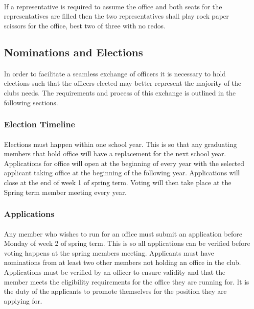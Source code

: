 \documentclass[12pt]{article}
\begin{document}
\paragraph{}
If a representative is required to assume the office and both seats for the representatives are 
filled then the two representatives shall play rock paper scissors for the office, best two of three
with no redos.

 
\subsection{Nominations and Elections}
\paragraph{}
In order to facilitate a seamless exchange of officers it is necessary to hold elections such that the officers elected may better represent the majority of the clubs needs. The requirements and process of this exchange is outlined in the following sections.

\subsubsection{Election Timeline}
\paragraph{}
Elections must happen within one school year. This is so that any graduating members that hold office will have a replacement for the next school year. Applications for office will open at the 
beginning of every year with the selected applicant taking office at the beginning of the following 
year. Applications will close at the end of week 1 of spring term. Voting will then take place at the Spring term member meeting every year.

\subsubsection{Applications}
\paragraph{}
Any member who wishes to run for an office must submit an application before Monday of week 2 of spring term. 
This is so all applications can be verified before voting happens at the spring members meeting.
Applicants must have nominations from at least two other members not holding an office in the club. 
Applications must be verified by an officer to ensure validity and that the member meets the eligibility requirements for the office they are running for.
It is the duty of the applicants to promote themselves for the position they are applying for. 
\end{document}
